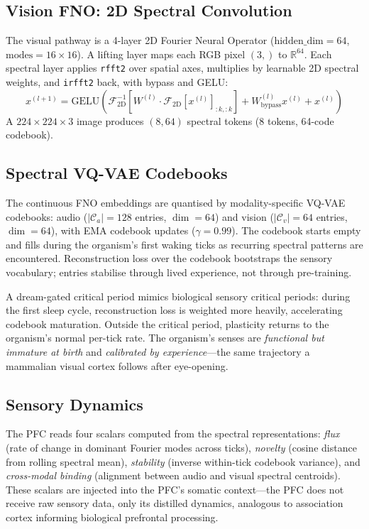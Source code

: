 \documentclass[11pt,a4paper,twocolumn]{article}
\begin{document}
\subsection{Vision FNO: 2D Spectral Convolution}

The visual pathway is a 4-layer 2D Fourier Neural Operator
($\mathrm{hidden\_dim}=64$, $\mathrm{modes}=16 \times 16$).
A lifting layer maps each RGB pixel $(3,)$ to $\mathbb{R}^{64}$. Each spectral layer applies
\texttt{rfft2} over spatial axes, multiplies by learnable 2D spectral weights, and
\texttt{irfft2} back, with bypass and GELU:
\begin{equation}
x^{(l+1)} = \mathrm{GELU}\!\left(\mathcal{F}_{\mathrm{2D}}^{-1}\!\left[W^{(l)} \cdot \mathcal{F}_{\mathrm{2D}}[x^{(l)}]_{:k,:k}\right] + W_{\mathrm{bypass}}^{(l)} x^{(l)} + x^{(l)}\right)
\end{equation}
A $224 \times 224 \times 3$ image produces $(8, 64)$ spectral tokens (8 tokens, 64-code codebook).

\subsection{Spectral VQ-VAE Codebooks}

The continuous FNO embeddings are quantised by modality-specific VQ-VAE codebooks:
audio ($|\mathcal{C}_a| = 128$ entries, $\dim = 64$) and vision ($|\mathcal{C}_v| = 64$
entries, $\dim = 64$), with EMA codebook updates ($\gamma = 0.99$). The codebook starts
empty and fills during the organism's first waking ticks as recurring spectral patterns
are encountered. Reconstruction loss over the codebook bootstraps the sensory vocabulary;
entries stabilise through lived experience, not through pre-training.

A dream-gated critical period mimics biological sensory critical periods: during the first
sleep cycle, reconstruction loss is weighted more heavily, accelerating codebook maturation.
Outside the critical period, plasticity returns to the organism's normal per-tick rate.
The organism's senses are \emph{functional but immature at birth} and \emph{calibrated
by experience}---the same trajectory a mammalian visual cortex follows after eye-opening.

\subsection{Sensory Dynamics}

The PFC reads four scalars computed from the spectral representations:
\emph{flux} (rate of change in dominant Fourier modes across ticks),
\emph{novelty} (cosine distance from rolling spectral mean),
\emph{stability} (inverse within-tick codebook variance), and
\emph{cross-modal binding} (alignment between audio and visual spectral centroids).
These scalars are injected into the PFC's somatic context---the PFC does not receive raw
sensory data, only its distilled dynamics, analogous to association cortex informing
biological prefrontal processing.
\end{document}
